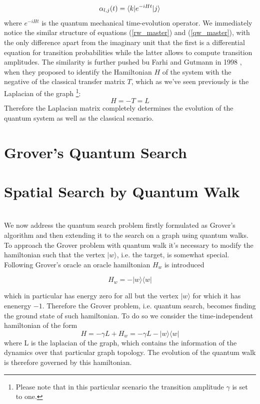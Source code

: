 \begin{equation}
  \alpha_{l,j}(t) = \braket{k|e^{-iHt}|j}
  \label{qw_master}
\end{equation}
where $e^{-iHt}$ is the quantum mechanical time-evolution operator. We immediately notice the similar structure of equations (\ref{rw_master}) and (\ref{qw_master}), with the only difference apart from the imaginary unit  that the first is a differential equation for transition probabilities while the latter allows to compute transition amplitudes. The similarity is further pushed bu Farhi and Gutmann in 1998 \cite{Childs2001}, when they proposed to identify the Hamiltonian $H$ of the system with the negative of the classical transfer matrix $T$, which as we've seen previously is the Laplacian of the graph \footnote{Please note that in this particular scenario the transition amplitude $\gamma$ is set to one.}:
\begin{equation}
  H = -T = L
\end{equation}
Therefore the Laplacian matrix completely determines the evolution of the quantum system as well as the classical scenario.



\section{Grover's Quantum Search}

\section{Spatial Search by Quantum Walk}
\\
We now address the quantum search problem firstly formulated as Grover's algorithm and then extending it to the search on a graph using quantum walks. \\
To approach the Grover problem with quantum walk it's necessary to modify the hamiltonian such that the vertex $|w\rangle$, i.e. the target, is somewhat special. Following Grover's oracle an oracle hamiltonian $H_w$ is introduced

\begin{equation}
  H_w = -|w\rangle\langle w|
\end{equation}

which in particular has energy zero for all but the vertex $|w\rangle$ for which it has enenergy $-1$. Therefore the Grover problem, i.e. quantum search, becomes finding the ground state of such hamiltonian. To do so we consider the time-independent hamiltonian of the form
\begin{equation}
  H = -\gamma L + H_w = -\gamma L -|w\rangle\langle w|
\end{equation}
where L is the laplacian of the graph, which contains the information of the dynamics over that particular graph topology. The evolution of the quantum walk is therefore governed by this hamiltonian.\\

